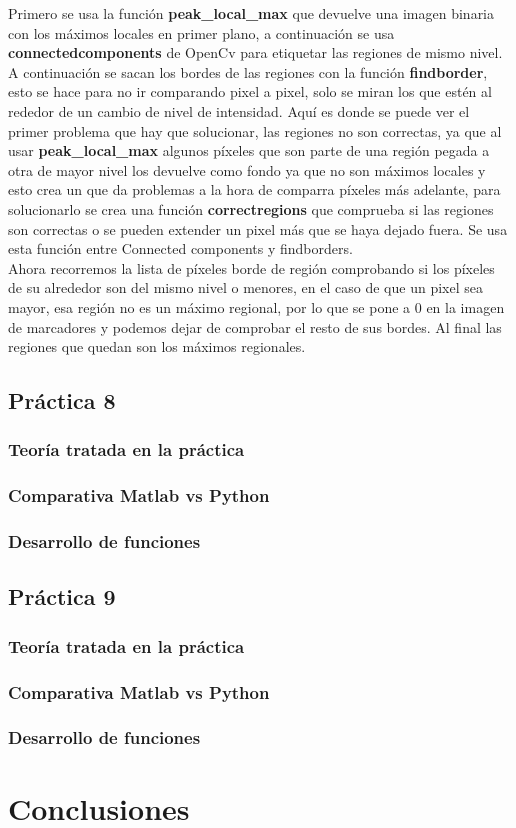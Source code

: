 \documentclass[a4paper,12pt]{report}
\begin{document}
Primero se usa la función \textbf{peak\_local\_max}  que devuelve una imagen binaria con los máximos locales en primer plano, a continuación se usa \textbf{connectedcomponents} de OpenCv para etiquetar las regiones de mismo nivel. A continuación se sacan los bordes de las regiones con la función \textbf{findborder}, esto se hace para no ir comparando pixel a pixel, solo se miran los que estén al rededor de un cambio de nivel de intensidad. Aquí es donde se puede ver el primer problema que hay que solucionar, las regiones no son correctas, ya que al usar \textbf{peak\_local\_max} algunos píxeles que son parte de una región pegada a otra de mayor nivel los devuelve como fondo ya que no son máximos locales y esto crea un que da problemas a la hora de comparra píxeles más adelante, para solucionarlo se crea una función \textbf{correctregions} que comprueba si las regiones son correctas o se pueden extender un pixel más que se haya dejado fuera. Se usa esta función entre Connected components y findborders.\\

Ahora recorremos la lista de píxeles borde de región comprobando si los píxeles de su alrededor son del mismo nivel o menores, en el caso de que un pixel sea mayor, esa región no es un máximo regional, por lo que se pone a 0 en la imagen de marcadores y podemos dejar de comprobar el resto de sus bordes. Al final las regiones que quedan son los máximos regionales.


\section{ Práctica 8}
\subsection{Teoría tratada en la práctica}
\subsection{Comparativa Matlab vs Python}
\subsection{Desarrollo de funciones}

\section{ Práctica 9}
\subsection{Teoría tratada en la práctica}
\subsection{Comparativa Matlab vs Python}
\subsection{Desarrollo de funciones}


\chapter{Conclusiones}

\nocite{*}
\printbibliography[heading=bibintoc,title={Bibliography}]
\end{document}
